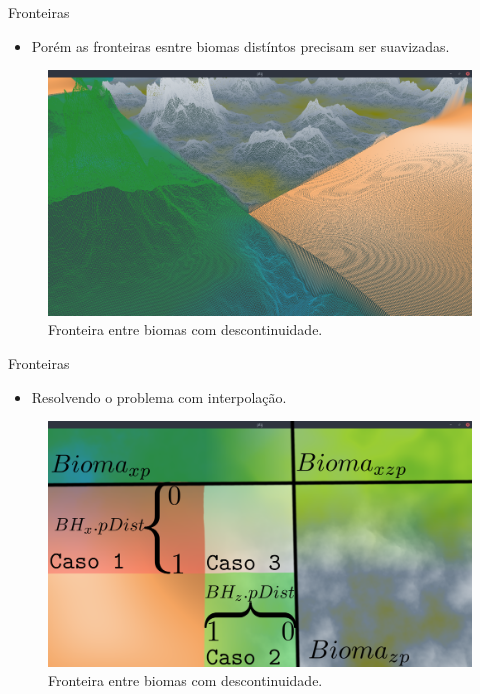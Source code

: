 \begin{frame}{Fronteiras}
    \begin{itemize} \setlength\itemsep{1em}
        \item Porém as fronteiras esntre biomas distíntos precisam ser suavizadas.
    \end{itemize}
    
    \begin{figure}[H]
        \centering
        \includegraphics[width=.9\textwidth]{img/descontinuos.png}
        \caption{Fronteira entre biomas com descontinuidade.}
        \label{fig:descontinuos}
    \end{figure}
    
\end{frame}

\begin{frame}{Fronteiras}
    \begin{itemize} \setlength\itemsep{1em}
        \item Resolvendo o problema com interpolação.
    \end{itemize}
    
    \begin{figure}[H]
        \centering
        \includegraphics[width=.9\textwidth]{img/border/yeah.png}
        \caption{Fronteira entre biomas com descontinuidade.}
        \label{fig:img_border_yeah}
    \end{figure}
    
\end{frame}

